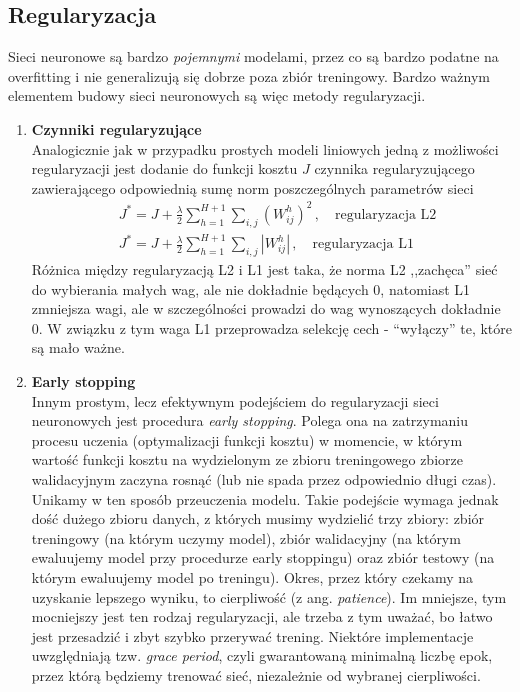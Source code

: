\documentclass{myclass}
\begin{document}
\subsection{Regularyzacja}

Sieci neuronowe są bardzo \textit{pojemnymi} modelami, przez co są bardzo podatne na overfitting i
nie generalizują się dobrze poza zbiór treningowy. Bardzo ważnym elementem budowy sieci neuronowych
są więc metody regularyzacji. 

\begin{enumerate}
    \item \textbf{Czynniki regularyzujące}\\
    Analogicznie jak w przypadku prostych modeli liniowych jedną z możliwości regularyzacji jest
    dodanie do funkcji kosztu \(J\) czynnika regularyzującego zawierającego odpowiednią sumę norm
    poszczególnych parametrów sieci
    \begin{equation*}
        \begin{split}
            &J^* = J + \frac{\lambda}{2}\sum_{h=1}^{H+1}\sum_{i,j} \left(W_{ij}^h\right)^2\,,\quad\text{regularyzacja L2}\\
            &J^* = J + \frac{\lambda}{2}\sum_{h=1}^{H+1}\sum_{i,j} \left|W_{ij}^h\right|\,,\quad\text{regularyzacja L1}
        \end{split}
    \end{equation*}
    Różnica między regularyzacją L2 i L1 jest taka, że norma L2 ,,zachęca” sieć do wybierania małych
    wag, ale nie dokładnie będących 0, natomiast L1 zmniejsza wagi, ale w szczególności prowadzi do
    wag wynoszących dokładnie 0. W związku z tym waga L1 przeprowadza selekcję cech - “wyłączy” te,
    które są mało ważne.

    \item \textbf{Early stopping}\\
    Innym prostym, lecz efektywnym podejściem do regularyzacji sieci neuronowych jest procedura
    \textit{early stopping}. Polega ona na zatrzymaniu procesu uczenia (optymalizacji funkcji
    kosztu) w momencie, w którym wartość funkcji kosztu na wydzielonym ze zbioru treningowego
    zbiorze walidacyjnym zaczyna rosnąć (lub nie spada przez odpowiednio długi czas). Unikamy w ten
    sposób przeuczenia modelu. Takie podejście wymaga jednak dość dużego zbioru danych, z których
    musimy wydzielić trzy zbiory: zbiór treningowy (na którym uczymy model), zbiór walidacyjny (na
    którym ewaluujemy model przy procedurze early stoppingu) oraz zbiór testowy (na którym
    ewaluujemy model po treningu). Okres, przez który czekamy na uzyskanie lepszego wyniku, to
    cierpliwość (z ang. \textit{patience}). Im mniejsze, tym mocniejszy jest ten rodzaj
    regularyzacji, ale trzeba z tym uważać, bo łatwo jest przesadzić i zbyt szybko przerywać
    trening. Niektóre implementacje uwzględniają tzw. \textit{grace period}, czyli gwarantowaną
    minimalną liczbę epok, przez którą będziemy trenować sieć, niezależnie od wybranej cierpliwości.


\end{enumerate}
\end{document}
